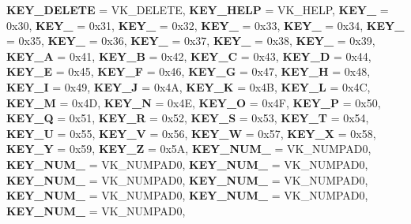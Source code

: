 \begin{DoxyCompactItemize}
{\bfseries K\+E\+Y\+\_\+\+D\+E\+L\+E\+TE} = V\+K\+\_\+\+D\+E\+L\+E\+TE, 
{\bfseries K\+E\+Y\+\_\+\+H\+E\+LP} = V\+K\+\_\+\+H\+E\+LP, 
\newline
{\bfseries K\+E\+Y\+\_} = 0x30, 
{\bfseries K\+E\+Y\+\_} = 0x31, 
{\bfseries K\+E\+Y\+\_} = 0x32, 
{\bfseries K\+E\+Y\+\_} = 0x33, 
\newline
{\bfseries K\+E\+Y\+\_} = 0x34, 
{\bfseries K\+E\+Y\+\_} = 0x35, 
{\bfseries K\+E\+Y\+\_} = 0x36, 
{\bfseries K\+E\+Y\+\_} = 0x37, 
\newline
{\bfseries K\+E\+Y\+\_} = 0x38, 
{\bfseries K\+E\+Y\+\_} = 0x39, 
{\bfseries K\+E\+Y\+\_\+A} = 0x41, 
{\bfseries K\+E\+Y\+\_\+B} = 0x42, 
\newline
{\bfseries K\+E\+Y\+\_\+C} = 0x43, 
{\bfseries K\+E\+Y\+\_\+D} = 0x44, 
{\bfseries K\+E\+Y\+\_\+E} = 0x45, 
{\bfseries K\+E\+Y\+\_\+F} = 0x46, 
\newline
{\bfseries K\+E\+Y\+\_\+G} = 0x47, 
{\bfseries K\+E\+Y\+\_\+H} = 0x48, 
{\bfseries K\+E\+Y\+\_\+I} = 0x49, 
{\bfseries K\+E\+Y\+\_\+J} = 0x4A, 
\newline
{\bfseries K\+E\+Y\+\_\+K} = 0x4B, 
{\bfseries K\+E\+Y\+\_\+L} = 0x4C, 
{\bfseries K\+E\+Y\+\_\+M} = 0x4D, 
{\bfseries K\+E\+Y\+\_\+N} = 0x4E, 
\newline
{\bfseries K\+E\+Y\+\_\+O} = 0x4F, 
{\bfseries K\+E\+Y\+\_\+P} = 0x50, 
{\bfseries K\+E\+Y\+\_\+Q} = 0x51, 
{\bfseries K\+E\+Y\+\_\+R} = 0x52, 
\newline
{\bfseries K\+E\+Y\+\_\+S} = 0x53, 
{\bfseries K\+E\+Y\+\_\+T} = 0x54, 
{\bfseries K\+E\+Y\+\_\+U} = 0x55, 
{\bfseries K\+E\+Y\+\_\+V} = 0x56, 
\newline
{\bfseries K\+E\+Y\+\_\+W} = 0x57, 
{\bfseries K\+E\+Y\+\_\+X} = 0x58, 
{\bfseries K\+E\+Y\+\_\+Y} = 0x59, 
{\bfseries K\+E\+Y\+\_\+Z} = 0x5A, 
\newline
{\bfseries K\+E\+Y\+\_\+\+N\+U\+M\+\_} = V\+K\+\_\+\+N\+U\+M\+P\+A\+D0, 
{\bfseries K\+E\+Y\+\_\+\+N\+U\+M\+\_} = V\+K\+\_\+\+N\+U\+M\+P\+A\+D0, 
{\bfseries K\+E\+Y\+\_\+\+N\+U\+M\+\_} = V\+K\+\_\+\+N\+U\+M\+P\+A\+D0, 
{\bfseries K\+E\+Y\+\_\+\+N\+U\+M\+\_} = V\+K\+\_\+\+N\+U\+M\+P\+A\+D0, 
\newline
{\bfseries K\+E\+Y\+\_\+\+N\+U\+M\+\_} = V\+K\+\_\+\+N\+U\+M\+P\+A\+D0, 
{\bfseries K\+E\+Y\+\_\+\+N\+U\+M\+\_} = V\+K\+\_\+\+N\+U\+M\+P\+A\+D0, 
{\bfseries K\+E\+Y\+\_\+\+N\+U\+M\+\_} = V\+K\+\_\+\+N\+U\+M\+P\+A\+D0, 
{\bfseries K\+E\+Y\+\_\+\+N\+U\+M\+\_} = V\+K\+\_\+\+N\+U\+M\+P\+A\+D0, 
\newline

\end{DoxyCompactItemize}
